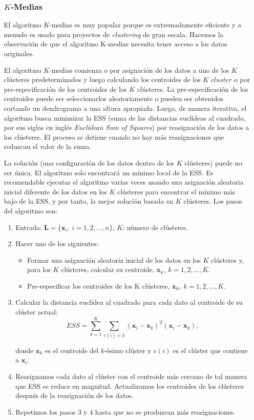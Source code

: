 \documentclass[a4paper, 20pt]{article}
\begin{document}
\subsubsection{$K$-Medias}

El algoritmo $K$-medias es muy popular porque es extremadamente eficiente y a menudo es usado para proyectos de \textit{clustering} de gran escala. Hacemos la observación de que el algoritmo K-medias necesita tener acceso a los datos originales.

El algoritmo $K$-medias comienza o por asignación de los datos a uno de los $K$ clústeres predeterminados y luego calculando los centroides de los $K$ \textit{$cluster$} o por pre-especificación de los centroides de los $K$ clústeres. La pre-especificación de los centroides puede ser seleccionarlos aleatoriamente o pueden ser obtenidos cortando un dendrograma a una altura apropiada. Luego, de manera iterativa, el algoritmo busca minimizar la ESS (suma de las distancias euclídeas al cuadrado, por sus siglas en inglés \textit{Euclidean Sum of Squares}) por reasignación de los datos a los clústeres. El proceso se detiene cuando no hay más reasignaciones  que reduzcan el valor de la suma.

La solución (una configuración de los datos dentro de los $K$ clústeres) puede no ser única. El algoritmo solo encontrará un mínimo local de la ESS. Es recomendable ejecutar el algoritmo varias veces usando una asignación aleatoria inicial diferente de los datos en los $K$ clústeres para encontrar el mínimo más bajo de la ESS, y por tanto, la mejor solución basada en $K$ clústeres. Los pasos del algoritmo son:
\begin{enumerate}
\item Entrada: $\textbf{L}=\{\textbf{x}_i,\ i=1,2,...,n\}$, $K$: número de clústeres.

\item Hacer uno de los siguientes:
\begin{itemize}
\item Formar una asignación aleatoria inicial de los datos en los $K$ clústeres y, para los $K$ clústeres, calcular su centroide, $\overline{\textbf{x}}_k,\ k=1,2,...,K$.
\item Pre-especificar los centroides de los K clústeres, $\overline{\textbf{x}}_k,\ k=1,2,...,K$.
\end{itemize}
\item Calcular la distancia euclídea al cuadrado para cada dato al centroide de su clúster actual:
$$ESS=\sum_{k=1}^{K}\sum_{c(i)=k}(\textbf{x}_i - \overline{\textbf{x}}_k)^T(\textbf{x}_i - \overline{\textbf{x}}_k),$$

donde $\overline{\textbf{x}}_k$ es el centroide del $k$-ésimo clúster y $c(i)$ es el clúster que contiene a $\textbf{x}_i$.

\item Reasignamos cada dato al clúster con el centroide más cercano de tal manera que ESS se reduce en magnitud. Actualizamos los centroides de los clústeres después de la reasignación de los datos. 
\item Repetimos los pasos 3 y 4 hasta que no se produzcan más reasignaciones.
\end{enumerate}
\end{document}

